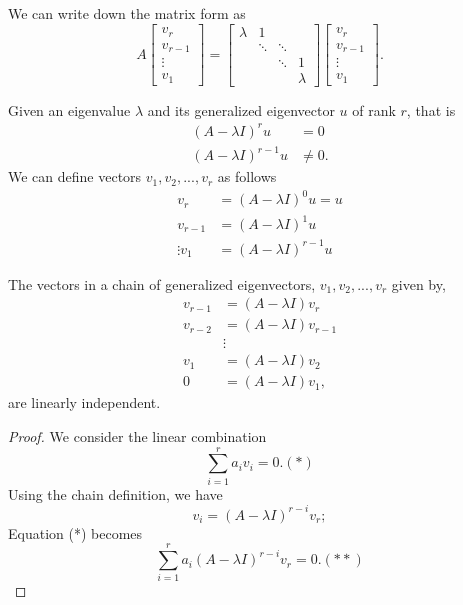 \begin{refsection}
\begin{definition}
We can write down the matrix form as
$$A\begin{bmatrix}
v_r\\
v_{r-1}\\
\vdots\\
v_1
\end{bmatrix} = \begin{bmatrix}
\lambda & 1 &  & \\ 
& \ddots & \ddots & \\ 
&  & \ddots & 1\\ 
&  &  & \lambda
\end{bmatrix}\begin{bmatrix}
v_r\\
v_{r-1}\\
\vdots\\
v_1
\end{bmatrix}.$$
\end{definition}




\begin{remark}
	Given an eigenvalue $\lambda$ and its generalized eigenvector $u$ of rank $r$, that is
	\begin{align*}
	(A - \lambda I)^ru &= 0\\
	(A - \lambda I)^{r-1}u &\neq 0.
	\end{align*}
	We can define vectors $v_1,v_2,...,v_r$ as follows
	\begin{align*}
	v_r &= (A - \lambda I)^0 u = u\\
	v_{r-1} &= (A - \lambda I)^1 u \\
	\vdots
	v_{1} &= (A - \lambda I)^{r-1} u 
	\end{align*}	
\end{remark}

\begin{theorem} \label{linearIndependenceChainofGeneralizedEigenvectors}
The vectors in a chain of generalized eigenvectors, $v_1,v_2,...,v_r$ given by, 
	\begin{align*}
v_{r-1} &= (A - \lambda I)v_r\\
v_{r-2} &= (A - \lambda I)v_{r-1}\\
&\vdots\\
v_{1} &= (A - \lambda I)v_{2}\\
0 &= (A - \lambda I)v_{1},
\end{align*}
 are linearly independent.	
\end{theorem}
\begin{proof}
We consider the linear combination
$$\sum_{i=1}^{r} a_iv_i = 0.(*)$$
Using the chain definition, we have
$$v_i = (A - \lambda I)^{r-i}v_r;$$
Equation (*) becomes 
$$\sum_{i=1}^{r} a_i(A - \lambda I)^{r-i}v_r = 0.(**)$$


\end{proof}
\end{refsection}
